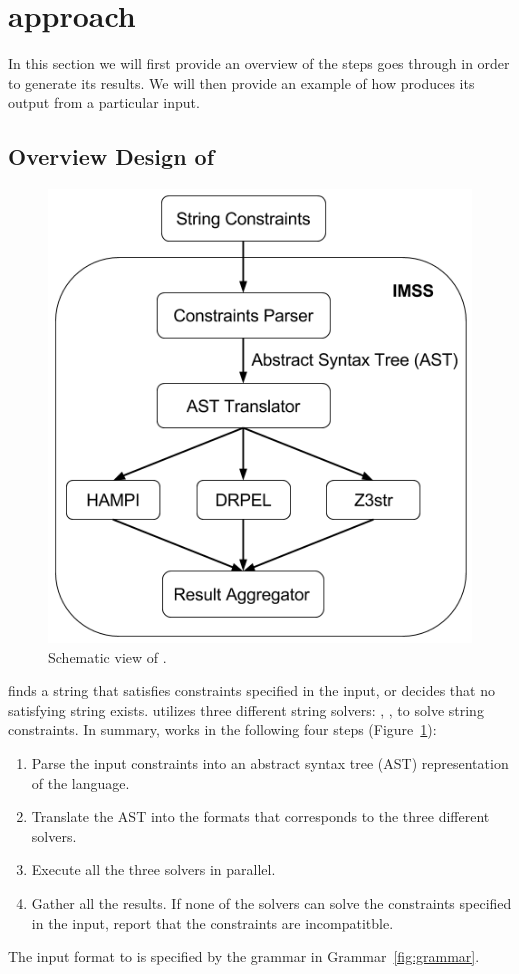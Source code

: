 \section{approach}
\label{sec:approach}

In this section we will first provide an overview of the steps \imss goes through
in order to generate its results. We will then provide an example of how \imss
produces its output from a particular input.

\subsection{Overview Design of \imss}
\begin{figure}[H]
    \center
    \includegraphics[scale=0.45]{imss}
    \caption{\label{fig:imss}Schematic view of \imss.}
\end{figure}
\imss finds a string that satisfies constraints specified in the input,
or decides that no satisfying string exists. \imss utilizes three different
string solvers: \hampi, \dprle, \zstr to solve string
constraints. In summary, \imss works in the following four steps (Figure~\ref{fig:imss}):
\begin{enumerate}
    \item Parse the input constraints into an abstract syntax tree (AST)
    representation of the \imss language.
    \item Translate the AST into the formats that corresponds to the three different solvers.
    \item Execute all the three solvers in parallel.
    \item Gather all the results. If none of the solvers can solve the constraints
    specified in the input, report that the constraints are incompatitble.
\end{enumerate}
The input format to \imss is specified by the grammar in Grammar~\ref{fig:grammar}.

